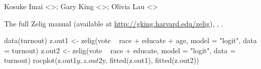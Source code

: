 \begin{Author}\relax
Kosuke Imai <>; Gary King
<>; Olivia Lau <>
\end{Author}
\begin{SeeAlso}\relax
The full Zelig manual (available at
\url{http://gking.harvard.edu/zelig}), , .
\end{SeeAlso}
\begin{Examples}
\begin{ExampleCode}
data(turnout)
z.out1 <- zelig(vote ~ race + educate + age, model = "logit", 
  data = turnout)
z.out2 <- zelig(vote ~ race + educate, model = "logit", 
  data = turnout)
rocplot(z.out1$y, z.out2$y, fitted(z.out1), fitted(z.out2))
\end{ExampleCode}
\end{Examples}


